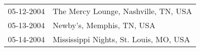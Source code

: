 \begin{supertabular}{ll}
 05-12-2004 &    The Mercy Lounge, Nashville, TN, USA \\
 05-13-2004 &               Newby's, Memphis, TN, USA \\
 05-14-2004 &  Mississippi Nights, St. Louis, MO, USA \\
\end{supertabular}
